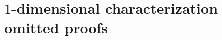 \documentclass[anon]{colt2020} %
\newcommand{\Comments}{1}
\newcommand{\mynote}[2]{\ifnum\Comments=1\textcolor{#1}{#2}\fi}
\newcommand{\jessie}[1]{\mynote{purple}{[JF: #1]}}
\newcommand{\abstain}[1]{\mathrm{abstain}_{#1}}
\begin{document}
%
\newpage



\newpage
\appendix

\section{$1$-dimensional characterization omitted proofs}
\end{document}
